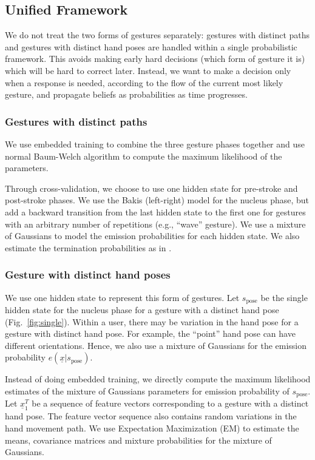 \subsection{Unified Framework}\label{sec:unified}
We do not treat the two forms of gestures separately: gestures with
distinct paths and gestures with distinct hand poses are handled within a
single probabilistic framework. This avoids making early hard decisions (which
form of gesture it is) which will be hard to correct later. Instead, we want to
make a decision only when a response is needed, according to the flow of the
current most likely gesture, and propagate beliefs as probabilities as time progresses.

\subsubsection{Gestures with distinct paths}
We use embedded training to
combine the three gesture phases together and use normal Baum-Welch algorithm to compute the
maximum likelihood of the parameters. 

Through cross-validation, we choose to use one hidden state for pre-stroke and
post-stroke phases. We use the Bakis (left-right) model \cite{Bauer00} for the
nucleus phase, but add a backward transition from the last hidden state to the first
one for gestures with an arbitrary number of repetitions (e.g., ``wave''
gesture). We use a mixture of Gaussians to model the emission probabilities for
each hidden state. We also estimate the termination
probabilities as in \cite{yin13}.

\subsubsection{Gesture with distinct hand poses}
We use one hidden state to represent this form of gestures. Let
$s_{\text{pose}}$ be the single hidden state for the nucleus phase for a gesture
with a distinct hand pose (Fig.~\ref{fig:single}). 
 Within a user,
there may be variation in the hand pose for a gesture with distinct hand pose. For example, the ``point'' hand pose can have different orientations. 
Hence, we also use a mixture of Gaussians for the emission probability
$e(\underline{x} | s_\text{pose})$.

Instead of doing embedded
training, we directly compute the maximum likelihood estimates of the mixture of
Gaussians parameters for emission probability of  $s_{\text{pose}}$. Let
$\underline{x}_1^T$ be a sequence of feature vectors corresponding to a gesture with a distinct hand pose. 
The feature vector sequence also contains random variations in the hand movement
path. 
We use Expectation Maximization (EM) to estimate the means, covariance matrices
and mixture probabilities for the mixture of Gaussians.

